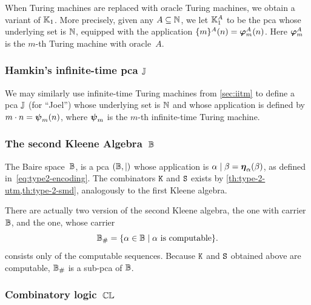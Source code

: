 When Turing machines are replaced with oracle Turing machines, we obtain a variant of $\mathbb{K}_1$. More precisely, given any $A \subseteq \mathbb{N}$, we let $\mathbb{K}_1^A$ to be the pca whose underlying set is $\mathbb{N}$, equipped with the application $\{m\}^A(n) = \text{\boldmath{$\varphi$}}^A_m(n)$. Here $\text{\boldmath{$\varphi$}}^A_m$ is the $m$-th Turing machine with oracle~$A$.

\subsubsection[\texorpdfstring%
{Hamkin's intfinite-time pca $\JJ$}%
{Hamkin's infinite-time pca $\JJ$}%
]{Hamkin's infinite-time pca $\JJ$}
\label{sec:hamkins-pca-oracle}%

We may similarly use infinite-time Turing machines from \cref{sec:iitm} to define a pca $\JJ$ (for ``Joel'') whose underlying set is $\mathbb{N}$ and whose application is defined by $m \cdot n = \text{\boldmath{$\psi$}}_{m}(n)$, where $\text{\boldmath{$\psi$}}_{m}$ is the $m$-th infinite-time Turing machine.


\subsubsection[\texorpdfstring%
{The second Kleene Algebra $\Baire$}%
{The second Kleene Algebra B}%
]{The second Kleene Algebra~$\Baire$}
\label{sec:second-kleene-pca}

The Baire space~$\Baire$, is a pca $(\mathbb{B}, {\mid})$ whose application is $\alpha \mid \beta = \text{\boldmath{$\eta$}}_{\alpha}(\beta)$, as defined in~\eqref{eq:type2-encoding}. The combinators $\mathtt{K}$ and $\mathtt{S}$ exists by \cref{th:type-2-utm,th:type-2-smd}, analogously to the first Kleene algebra.

There are actually two version of the second Kleene algebra, the  one
with carrier~$\Baire$, and the  one, whose carrier
%
\begin{equation*}
  \mathbb{B}_{\#} = \{\alpha \in \mathbb{B} \mid \text{$\alpha$ is computable}\}.
\end{equation*}
%
consists only of the computable sequences. Because $\mathtt{K}$ and $\mathtt{S}$ obtained above are computable, $\mathbb{B}_{\#}$ is a sub-pca of $\Baire$.

\subsubsection{Combinatory logic~$\mathbb{CL}$}
\label{sec:combinatory-logic-pca}

